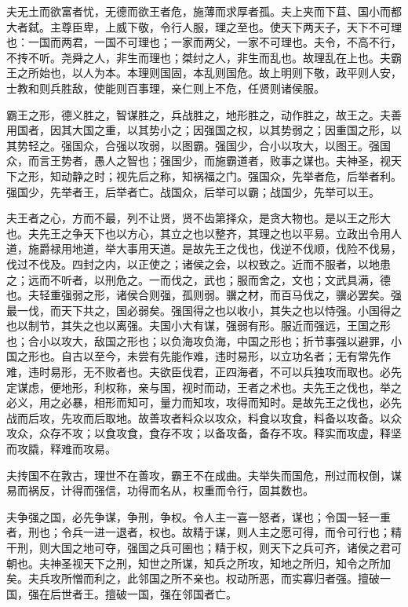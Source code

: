 \documentclass[]{article}
\begin{document}
夫无土而欲富者忧，无德而欲王者危，施薄而求厚者孤。夫上夹而下苴、国小而都大者弑。主尊臣卑，上威下敬，令行人服，理之至也。使天下两天子，天下不可理也：一国而两君，一国不可理也；一家而两父，一家不可理也。夫令，不高不行，不抟不听。尧舜之人，非生而理也；桀纣之人，非生而乱也。故理乱在上也。夫霸王之所始也，以人为本。本理则国固，本乱则国危。故上明则下敬，政平则人安，士教和则兵胜敌，使能则百事理，亲仁则上不危，任贤则诸侯服。

霸王之形，德义胜之，智谋胜之，兵战胜之，地形胜之，动作胜之，故王之。夫善用国者，因其大国之重，以其势小之；因强国之权，以其势弱之；因重国之形，以其势轻之。强国众，合强以攻弱，以图霸。强国少，合小以攻大，以图王。强国众，而言王势者，愚人之智也；强国少，而施霸道者，败事之谋也。夫神圣，视天下之形，知动静之时；视先后之称，知祸福之门。强国众，先举者危，后举者利。强国少，先举者王，后举者亡。战国众，后举可以霸；战国少，先举可以王。

夫王者之心，方而不最，列不让贤，贤不齿第择众，是贪大物也。是以王之形大也。夫先王之争天下也以方心，其立之也以整齐，其理之也以平易。立政出令用人道，施爵禄用地道，举大事用天道。是故先王之伐也，伐逆不伐顺，伐险不伐易，伐过不伐及。四封之内，以正使之；诸侯之会，以权致之。近而不服者，以地患之；远而不听者，以刑危之。一而伐之，武也；服而舍之，文也；文武具满，德也。夫轻重强弱之形，诸侯合则强，孤则弱。骥之材，而百马伐之，骥必罢矣。强最一伐，而天下共之，国必弱矣。强国得之也以收小，其失之也以恃强。小国得之也以制节，其失之也以离强。夫国小大有谋，强弱有形。服近而强远，王国之形也；合小以攻大，敌国之形也；以负海攻负海，中国之形也；折节事强以避罪，小国之形也。自古以至今，未尝有先能作难，违时易形，以立功名者；无有常先作难，违时易形，无不败者也。夫欲臣伐君，正四海者，不可以兵独攻而取也。必先定谋虑，便地形，利权称，亲与国，视时而动，王者之术也。夫先王之伐也，举之必义，用之必暴，相形而知可，量力而知攻，攻得而知时。是故先王之伐也，必先战而后攻，先攻而后取地。故善攻者料众以攻众，料食以攻食，料备以攻备。以众攻众，众存不攻；以食攻食，食存不攻；以备攻备，备存不攻。释实而攻虚，释坚而攻膬，释难而攻易。

夫抟国不在敦古，理世不在善攻，霸王不在成曲。夫举失而国危，刑过而权倒，谋易而祸反，计得而强信，功得而名从，权重而令行，固其数也。

夫争强之国，必先争谋，争刑，争权。令人主一喜一怒者，谋也；令国一轻一重者，刑也；令兵一进一退者，权也。故精于谋，则人主之愿可得，而令可行也；精干刑，则大国之地可夺，强国之兵可圉也；精于权，则天下之兵可齐，诸侯之君可朝也。夫神圣视天下之刑，知世之所谋，知兵之所攻，知地之所归，知令之所加矣。夫兵攻所憎而利之，此邻国之所不亲也。权动所恶，而实寡归者强。擅破一国，强在后世者王。擅破一国，强在邻国者亡。
\end{document}
